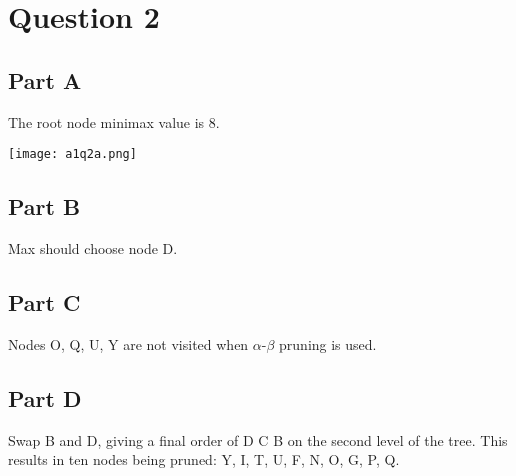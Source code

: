 \documentclass[a4paper]{article}
\begin{document}
\section{Question 2}



\subsection{Part A}
The root node minimax value is 8.
\begin{center}
\texttt{[image: a1q2a.png]}
\end{center}

\subsection{Part B}
Max should choose node D.

\subsection{Part C}
Nodes {O, Q, U, Y} are not visited when $\alpha$-$\beta$ pruning is used.

\subsection{Part D}
Swap B and D, giving a final order of {D C B} on the second level of the tree.
This results in ten nodes being pruned: {Y, I, T, U, F, N, O, G, P, Q}.
\end{document}
